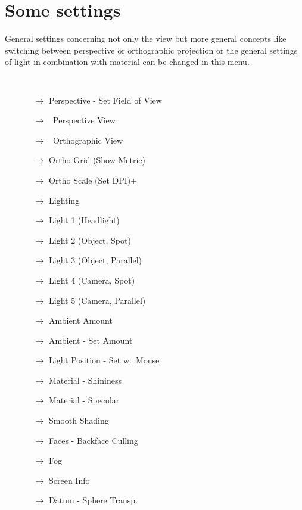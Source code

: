 \section{Some settings}\label{settings} 
General settings concerning not only the view but more general concepts like switching between perspective or orthographic projection or the general settings of light in combination with material can be changed in this menu.
{\tt
\begin{itemize}
\item[] 
 \begin{itemize}
 \item[$\rightarrow$]  Perspective - Set Field of View
 \item[$\rightarrow$] 	\textopenbullet\ Perspective View
 \item[$\rightarrow$] 	\textbullet\ Orthographic View
 \item[$\rightarrow$]  \checkmark Ortho Grid (Show Metric)\quad {}
 \item[$\rightarrow$] Ortho Scale (Set DPI)\!+\!
 \item[$\rightarrow$] \checkmark Lighting\qquad\qquad\qquad\qquad\quad {}
 \item[$\rightarrow$] Light 1 (Headlight)\qquad\quad\quad\ \!
 \item[$\rightarrow$] Light 2 (Object, Spot)\quad\quad\ \ \!
 \item[$\rightarrow$] Light 3 (Object, Parallel)\quad \!
 \item[$\rightarrow$] Light 4 (Camera, Spot) \quad\quad\ \!
 \item[$\rightarrow$] Light 5 (Camera, Parallel)\quad\!
 \item[$\rightarrow$] Ambient Amount\qquad\qquad\qquad\quad\!
 \color{gray}
 \item[$\rightarrow$] Ambient - Set Amount
 \color{black}
 \item[$\rightarrow$] Light Position - Set w.~Mouse\quad\!
 \color{gray}
 \item[$\rightarrow$] Material - Shininess
 \item[$\rightarrow$] Material - Specular
 \color{black}
 \item[$\rightarrow$] \checkmark Smooth Shading
 \item[$\rightarrow$] \checkmark Faces - Backface Culling\quad{}
 \item[$\rightarrow$] Fog
 \item[$\rightarrow$] \checkmark Screen Info
 \item[$\rightarrow$] Datum - Sphere Transp.
 \end{itemize}
 \end{itemize}
 }


